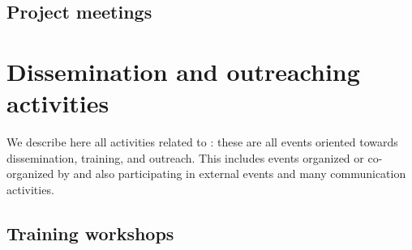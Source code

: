 \documentclass{deliverablereport}
\begin{document}














\subsection{Project meetings}





\section{Dissemination and outreaching activities}

We describe here all activities related to :
these are all events oriented towards dissemination, training, and outreach. This
includes events organized or co-organized by \ODK and also
participating in external events and many communication activities.

\subsection{Training workshops}


























\end{document}
